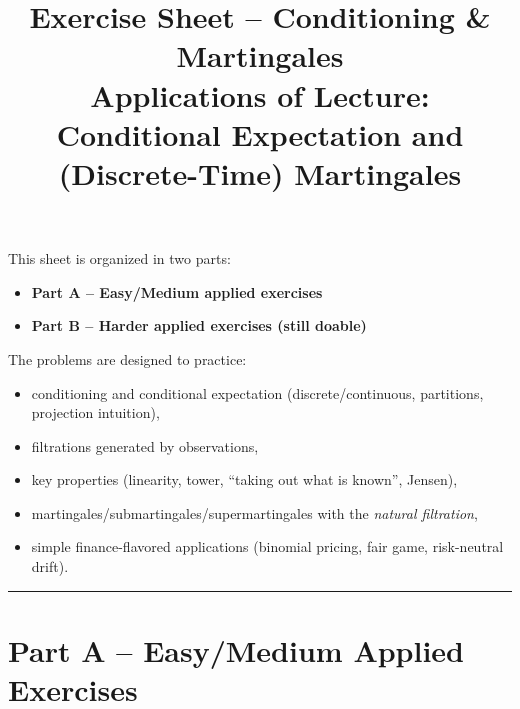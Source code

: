 \documentclass[11pt]{article}
\title{Exercise Sheet -- Conditioning \& Martingales\\[0.4em]
{\large Applications of Lecture: Conditional Expectation and (Discrete-Time) Martingales}}
\author{}
\date{}
\begin{document}
\maketitle

This sheet is organized in two parts:
\begin{itemize}
  \item \textbf{Part A -- Easy/Medium applied exercises}
  \item \textbf{Part B -- Harder applied exercises (still doable)}
\end{itemize}

The problems are designed to practice:
\begin{itemize}
  \item conditioning and conditional expectation (discrete/continuous, partitions, projection intuition),
  \item filtrations generated by observations,
  \item key properties (linearity, tower, ``taking out what is known'', Jensen),
  \item martingales/submartingales/supermartingales with the \emph{natural filtration},
  \item simple finance-flavored applications (binomial pricing, fair game, risk-neutral drift).
\end{itemize}

\bigskip
\hrule
\bigskip

\section*{Part A -- Easy/Medium Applied Exercises}
\end{document}
